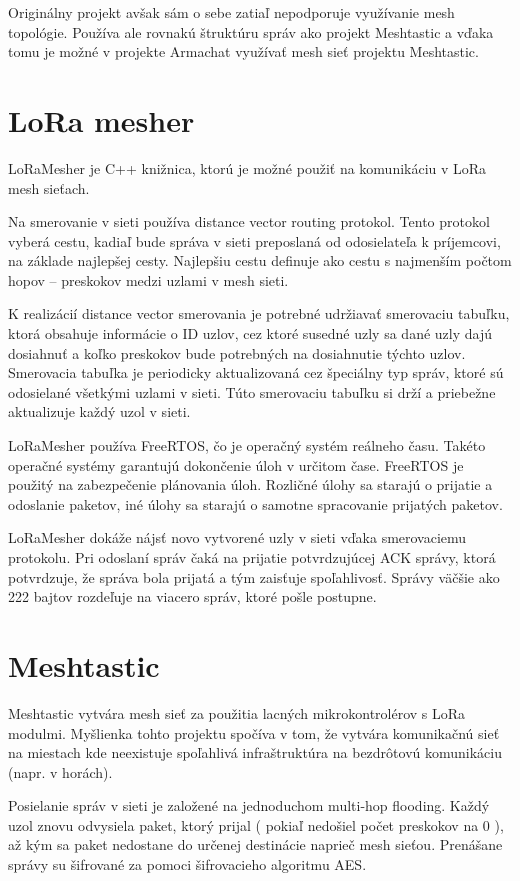 \documentclass[slovak,master]{diploma}
\begin{document}
Originálny projekt avšak sám o sebe zatiaľ nepodporuje využívanie mesh topológie. Používa ale rovnakú štruktúru správ ako projekt Meshtastic a vďaka tomu je možné 
v projekte Armachat využívať mesh sieť projektu Meshtastic.

\section{LoRa mesher}
LoRaMesher \cite{loramesher} je C++ knižnica, ktorú je možné použiť na komunikáciu v LoRa mesh sieťach.

Na smerovanie v sieti používa distance vector routing protokol. Tento protokol vyberá cestu, kadiaľ bude správa v sieti preposlaná od odosielateľa k príjemcovi, na základe 
najlepšej cesty. Najlepšiu cestu definuje ako cestu s najmenším počtom hopov -- preskokov medzi uzlami v mesh sieti.

K realizácií distance vector smerovania je potrebné udržiavať smerovaciu tabuľku, ktorá obsahuje informácie o ID uzlov, cez ktoré susedné uzly sa dané uzly dajú dosiahnuť a 
koľko preskokov bude potrebných na dosiahnutie týchto uzlov. Smerovacia tabuľka je periodicky aktualizovaná cez špeciálny typ správ, ktoré sú odosielané 
všetkými uzlami v sieti. Túto smerovaciu tabuľku si drží a priebežne aktualizuje každý uzol v sieti.

LoRaMesher používa FreeRTOS, čo je operačný systém reálneho času. Takéto operačné systémy garantujú dokončenie úloh v určitom čase.
FreeRTOS je použitý na zabezpečenie plánovania úloh. Rozličné úlohy sa starajú o prijatie a odoslanie paketov, iné úlohy sa starajú o samotne 
spracovanie prijatých paketov.

LoRaMesher dokáže nájsť novo vytvorené uzly v sieti vďaka smerovaciemu protokolu. Pri odoslaní správ čaká na prijatie potvrdzujúcej ACK správy, ktorá potvrdzuje, 
že správa bola prijatá a tým zaisťuje spoľahlivosť. Správy väčšie ako 222 bajtov rozdeľuje na viacero správ, ktoré pošle postupne.

\section{Meshtastic}
Meshtastic \cite{meshtastic} vytvára mesh sieť za použitia lacných mikrokontrolérov s LoRa modulmi.
Myšlienka tohto projektu spočíva v tom, že vytvára komunikačnú sieť na miestach kde neexistuje spoľahlivá infraštruktúra na bezdrôtovú komunikáciu (napr. v horách).

Posielanie správ v sieti je založené na jednoduchom multi-hop flooding.
Každý uzol znovu odvysiela paket, ktorý prijal ( pokiaľ nedošiel počet preskokov na 0 ), až kým sa paket nedostane do určenej destinácie naprieč mesh sieťou.
Prenášane správy su šifrované za pomoci šifrovacieho algoritmu AES.
\end{document}
